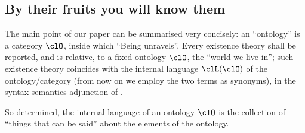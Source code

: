\subsection{By their fruits you will know them}\label{frutti}



The main point of our paper can be summarised very concisely: an ``ontology'' is a category $\clO$, inside which ``Being unravels''. Every existence theory shall be reported, and is relative, to a fixed ontology $\clO$, the ``world we live in''; such existence theory coincides with the internal language $\clL(\clO)$ of the ontology/category (from now on we employ the two terms as synonyms), in the syntax\hyp{}semantics adjunction of \cite{}.

So determined, the internal language of an ontology $\clO$ is the collection of ``things that can be said'' about the elements of the ontology.

